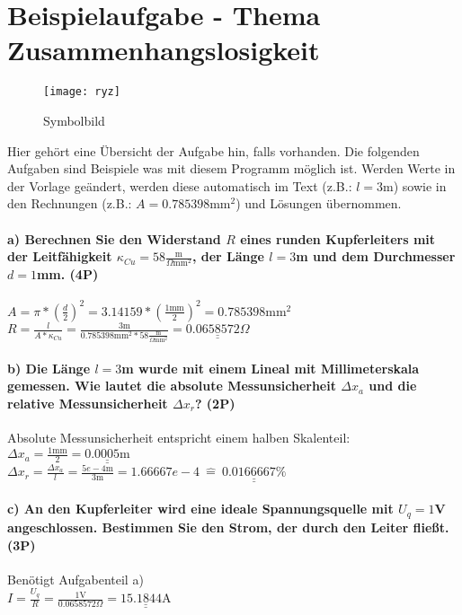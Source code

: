 \documentclass{article}
\begin{document}
\part*{Beispielaufgabe - Thema Zusammenhangslosigkeit}

\begin{wrapfigure}{r}{0.3\textwidth}
\centering
\texttt{[image: ryz]}
\caption*{Symbolbild}
\end{wrapfigure}
Hier gehört eine Übersicht der Aufgabe hin, falls vorhanden. Die folgenden Aufgaben sind Beispiele was mit diesem Programm möglich ist. Werden Werte in der Vorlage geändert, werden diese automatisch im Text (z.B.: $l= 3$m) sowie in den Rechnungen (z.B.: $A= 0.785398\text{mm}^2$) und Lösungen übernommen.\\
\subsection*{a) Berechnen Sie den Widerstand $R$ eines runden Kupferleiters mit der Leitfähigkeit $\kappa_{Cu}= 58\frac{\text{m}}{\Omega\text{mm}^2}$, der Länge $l = 3$m und dem Durchmesser $d = 1$mm. (4P)}

$
                    A=\pi*(\frac{d}{2})^2= 3.14159*(\frac{ 1\text{mm}}{2})^2= 0.785398\text{mm}^2
                    $\\\hfill \break$
                    R=\frac{l}{A*\kappa_{Cu}}=\frac{ 3\text{m}}{ 0.785398\text{mm}^2* 58\frac{\text{m}}{\Omega\text{mm}^2}}=\underline{\underline{ 0.0658572\Omega}}
                    $\\
\subsection*{b) Die Länge $l= 3$m wurde mit einem Lineal mit Millimeterskala gemessen. Wie lautet die absolute Messunsicherheit $\Delta x_a$ und die relative Messunsicherheit $\Delta x_r$? (2P)}

Absolute Messunsicherheit entspricht einem halben Skalenteil:\\\hfill \break$
                    \Delta x_a=\frac{1\text{mm}}{2}=\underline{\underline{0.0005\text{m}}}
                    $\\\hfill \break$
                    \Delta x_r=\frac{\Delta x_a}{l}=\frac{ 5e-4\text{m}}{ 3\text{m}}= 1.66667e-4\ \hat{=}\ \underline{\underline{ 0.0166667\%}}$\\
\subsection*{c) An den Kupferleiter wird eine ideale Spannungsquelle mit $U_q= 1$V angeschlossen. Bestimmen Sie den Strom, der durch den Leiter fließt. (3P)}

Benötigt Aufgabenteil a)\\\hfill \break$
                    I=\frac{U_q}{R}=\frac{ 1\text{V}}{ 0.0658572\Omega}=\underline{\underline{ 15.1844\text{A}}}
                    $\\
\end{document}
